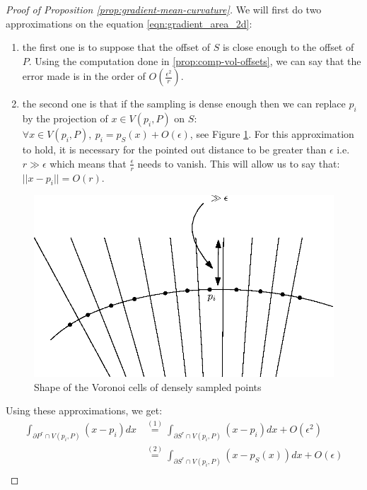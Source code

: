 \begin{proof}[Proof of Proposition \ref{prop:gradient-mean-curvature}]
We will first do two approximations on the equation \eqref{eqn:gradient_area_2d}:
\begin{enumerate}
    \item the first one is to suppose that the offset of $ S $ is close enough
        to the offset of $ P $. Using the computation done in
        \ref{prop:comp-vol-offsets}, we can say that the error made is in the
        order of $ O(\frac{\epsilon^2}{r}) $.
    \item the second one is that if the sampling is dense enough then we can
        replace $ p_i $ by the projection of $ x \in V(p_i, P) $ on $ S $: $
        \forall x \in V(p_i, P),~p_i = p_S(x) + O(\epsilon) $, see Figure
        \ref{fig:voronoi-cylinder}.  For this approximation to hold, it is
        necessary for the pointed out distance to be greater than $ \epsilon $
        i.e. $ r \gg \epsilon $ which means that $ \frac{\epsilon}{r} $ needs to
        vanish. This will allow us to say that: $ || x - p_i || = O(r) $.
\end{enumerate}

\begin{figure}[h]
    \centering
    \includegraphics[scale=0.6]{img/voronoi-cylinder}
    \caption{Shape of the Voronoi cells of densely sampled points}
    \label{fig:voronoi-cylinder}
\end{figure}

Using these approximations, we get:
\begin{align*}
    \int_{\partial{P^r} \cap V(p_i, P)} (x - p_i) dx & \stackrel{(1)}{=}
    \int_{\partial{S^r} \cap V(p_i,
        P)} (x - p_i) dx + O(\epsilon^2) \\
    &\stackrel{(2)}{=} \int_{\partial{S^r} \cap V(p_i, P)} (x - p_S(x)) dx +
    O(\epsilon) \\
\end{align*}


\end{proof}
